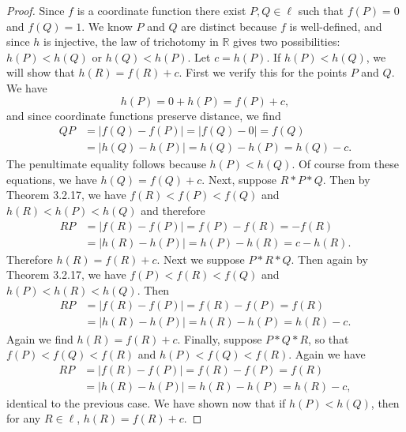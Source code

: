 \documentclass{article}
\newcommand{\real}{\mathbb{R}}
\begin{document}
\begin{proof} Since $f$ is a coordinate function there exist $P,Q \in\ell$ such that $f(P)=0$ and $f(Q)=1$. We know $P$ and $Q$ are distinct because $f$ is well-defined, and since $h$ is injective, the law of trichotomy in $\real$ gives two possibilities: $h(P)<h(Q)$ or $h(Q)<h(P).$ Let $c=h(P).$ If $h(P)<h(Q)$, we will show that $h(R)=f(R)+c$. First we verify this for the points $P$ and $Q$. We have $$h(P)=0+h(P)=f(P)+c,$$ and since coordinate functions preserve distance, we find 
 \begin{align*} QP&= |f(Q)-f(P)| =|f(Q)-0|= f(Q) \\
  &= |h(Q)-h(P)| =h(Q)-h(P)=h(Q)-c.\end{align*} The penultimate equality follows because $h(P)<h(Q)$. Of course from these equations, we have $h(Q)=f(Q)+c.$ Next, suppose $R*P*Q$. Then by Theorem 3.2.17, we have $f(R)<f(P)<f(Q)$ and $h(R)<h(P)<h(Q)$ and therefore\begin{align*} RP &=  |f(R)-f(P)| = f(P)-f(R) = -f(R) \\
  &=|h(R)-h(P)| = h(P)-h(R) = c - h(R). \end{align*} Therefore $h(R)=f(R)+c$. Next we suppose $P*R*Q$. Then again by Theorem 3.2.17, we have $f(P)<f(R)<f(Q)$ and $h(P)<h(R)<h(Q).$ Then
  \begin{align*} RP &=  |f(R)-f(P)| = f(R)-f(P) = f(R) \\
  &=|h(R)-h(P)| = h(R)-h(P) = h(R)-c. \end{align*} Again we find $h(R)=f(R)+c.$ Finally, suppose $P*Q*R$, so that $f(P)<f(Q)<f(R)$ and $h(P)<f(Q)<f(R)$. Again we have   \begin{align*} RP &=  |f(R)-f(P)| = f(R)-f(P) = f(R) \\
  &=|h(R)-h(P)| = h(R)-h(P) = h(R)-c, \end{align*} identical to the previous case. We have shown now that if $h(P)<h(Q)$, then for any $R\in\ell$, $h(R)=f(R)+c$.
  

\end{proof}
\end{document}
